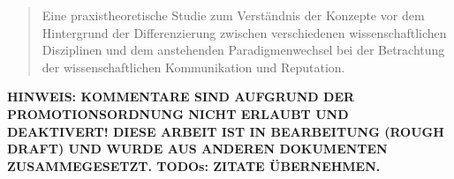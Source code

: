 \begin{abstract}Eine praxistheoretische Studie zum Verständnis der Konzepte vor dem Hintergrund der Differenzierung zwischen verschiedenen wissenschaftlichen Disziplinen und dem anstehenden Paradigmenwechsel bei der Betrachtung der wissenschaftlichen Kommunikation und Reputation.\end{abstract}

\textbf{HINWEIS: KOMMENTARE SIND AUFGRUND DER PROMOTIONSORDNUNG NICHT ERLAUBT UND DEAKTIVERT! DIESE ARBEIT IST IN BEARBEITUNG (ROUGH DRAFT) UND WURDE AUS ANDEREN DOKUMENTEN ZUSAMMEGESETZT. TODOs: ZITATE ÜBERNEHMEN.}